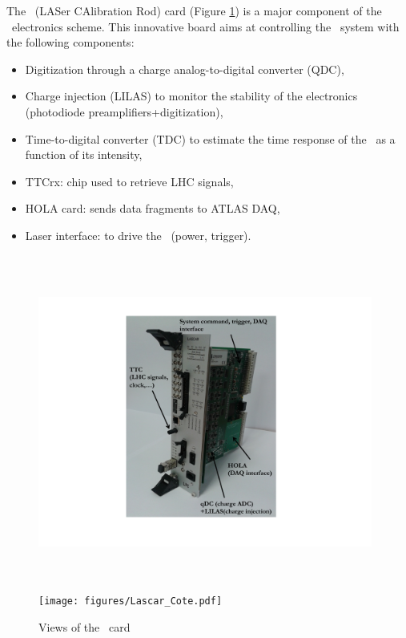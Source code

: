The \lascar~(LASer CAlibration Rod) card (Figure \ref{fig:laslascar}) is a major component of the \lasii~electronics scheme. This innovative board aims at controlling the \las~system with the following components:
\begin{itemize}

\item Digitization through a charge analog-to-digital converter (QDC),

\item Charge injection (LILAS) to monitor the stability of the electronics (photodiode preamplifiers+digitization),

\item Time-to-digital converter (TDC) to estimate the time response of the \las~as a function of its intensity,

\item TTCrx: chip used to retrieve LHC signals,

\item HOLA card: sends data fragments to ATLAS DAQ,

\item Laser interface: to drive the \las~(power, trigger).

\end{itemize}

\begin{figure}[htbp]

\centering
\includegraphics[height=11cm,width=11cm]{figures/Lascar_photo_black.pdf}
\texttt{[image: figures/Lascar\_Cote.pdf]}
\caption{Views of the \lascar~card}\label{fig:laslascar}
\end{figure}


